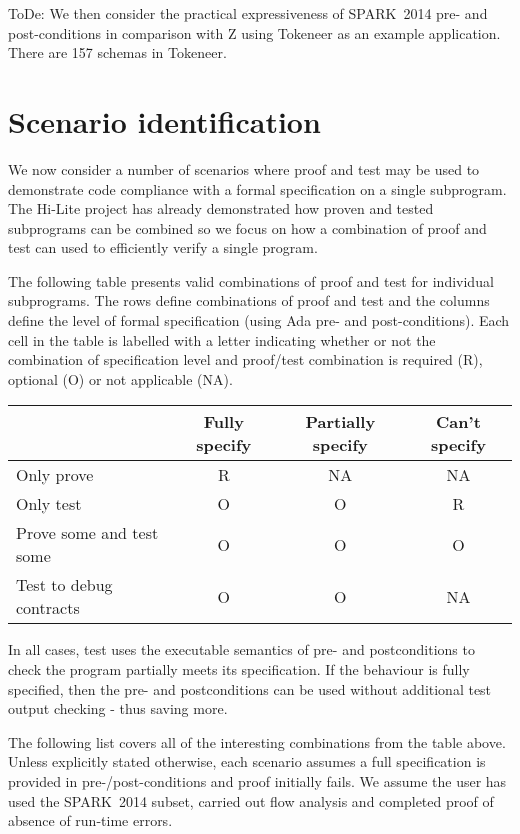 \documentclass{llncs}
\newcommand{\newspark}{SPARK~2014\xspace}
\begin{document}
ToDe: We then consider the practical expressiveness of \newspark pre-
and post-conditions in comparison with Z using Tokeneer as an example
application. There are 157 schemas in Tokeneer.


\section{Scenario identification}

We now consider a number of scenarios where proof and test may be
used to demonstrate code compliance with a formal
specification on a single subprogram.  The Hi-Lite project has already
demonstrated \cite{hiliteERTS2012} how proven and tested subprograms 
can be combined so we focus on how a combination of proof and test
can used to efficiently verify a single program.

The following table presents valid combinations of proof and test
for individual subprograms. The rows define combinations of proof
and test and the columns define the level of formal specification
(using Ada pre- and post-conditions). Each cell in the table is
labelled with a letter indicating whether or not the combination
of specification level and proof/test combination is required (R),
optional (O) or not applicable (NA).

\begin{center}
\begin{tabular}{l | c | c | c}
    & Fully specify & Partially specify & Can't specify \\
  \hline
  Only prove & R & NA & NA \\
  Only test & O & O & R \\
  Prove some and test some & O & O & O \\
  Test to debug contracts & O & O & NA \\
\end{tabular}
\end{center}

In all cases, test uses the executable semantics of pre- and 
postconditions to check the program partially meets its specification.
If the behaviour is fully specified, then the pre- and postconditions 
can be used without additional test output checking - thus saving more.

The following list covers all of the interesting combinations from 
the table above.
Unless explicitly stated
otherwise, each scenario assumes a full specification is provided in
pre-/post-conditions and proof initially fails.  
We assume the user has used the \newspark subset,
carried out flow analysis and completed proof of absence of run-time
errors.
\end{document}
